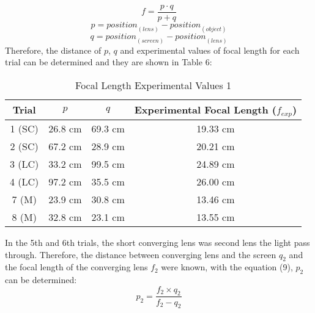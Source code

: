 \documentclass[12pt]{article}
\begin{document}
\begin{equation}
	f = \frac{p \cdot q}{p+q}
	\end{equation} 
	\begin{equation}
	p = {position}_{(lens)} - {position}_{(object)}
	\end{equation} 
\begin{equation}
	q = {position}_{(screen)} - {position}_{(lens)}
	\end{equation} 
Therefore, the distance of $p$, $q$ and experimental values of focal length for each trial can be determined and they are shown in Table 6:
\begin{table}[H]
\caption{Focal Length Experimental Values 1}
\centering
\begin{tabular}[width=05\linewidth]{cccc}
     
Trial &$p$ &$q$ &Experimental Focal Length (${f}_{exp}$)\\
\hline
1 (SC)&26.8 cm&69.3 cm&19.33 cm\\
2 (SC)&67.2 cm&28.9 cm&20.21 cm\\
3 (LC)&33.2 cm&99.5 cm&24.89 cm\\
4 (LC)&97.2 cm&35.5 cm&26.00 cm\\
7 (M)&23.9 cm&30.8 cm&13.46 cm\\
8 (M)&32.8 cm&23.1 cm&13.55 cm \\

      \hline
      \end{tabular}
\end{table}

In the 5th and 6th trials, the short converging lens was second lens the light pass through. Therefore, the distance between converging lens and the screen ${q}_{2}$ and the focal length of the converging lens ${f}_{2}$ were known, with the equation (9), ${p}_{2}$ can be determined:
\begin{equation}
{p}_{2} = \frac{{f}_{2} \times  {q}_{2}}{{f}_{2} -  {q}_{2}}
\end{equation}
\end{document}
